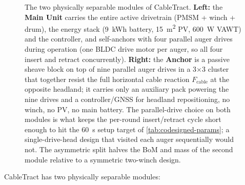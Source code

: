 \documentclass[11pt,a4paper]{article}
\begin{document}
\begin{figure}[H]
{%
}
\caption{The two physically separable modules of CableTract. \textbf{Left:} the \textbf{Main Unit} carries the entire active drivetrain (PMSM + winch + drum), the energy stack (\SI{9}{\kWh} battery, \SI{15}{\meter\squared} PV, \SI{600}{\watt} VAWT) and the controller, and self-anchors with four parallel auger drives during operation (one BLDC drive motor per auger, so all four insert and retract concurrently). \textbf{Right:} the \textbf{Anchor} is a passive sheave block on top of nine parallel auger drives in a 3$\times$3 cluster that together resist the full horizontal cable reaction $F_{\text{cable}}$ at the opposite headland; it carries only an auxiliary pack powering the nine drives and a controller/GNSS for headland repositioning, no winch, no PV, no main battery. The parallel-drive choice on both modules is what keeps the per-round insert/retract cycle short enough to hit the \SI{60}{\second} setup target of \cref{tab:codesigned-params}; a single-drive-head design that visited each auger sequentially would not. The asymmetric split halves the BoM and mass of the second module relative to a symmetric two-winch design.}
\label{fig:f0a}
\end{figure}

CableTract has two physically separable modules:
\end{document}
